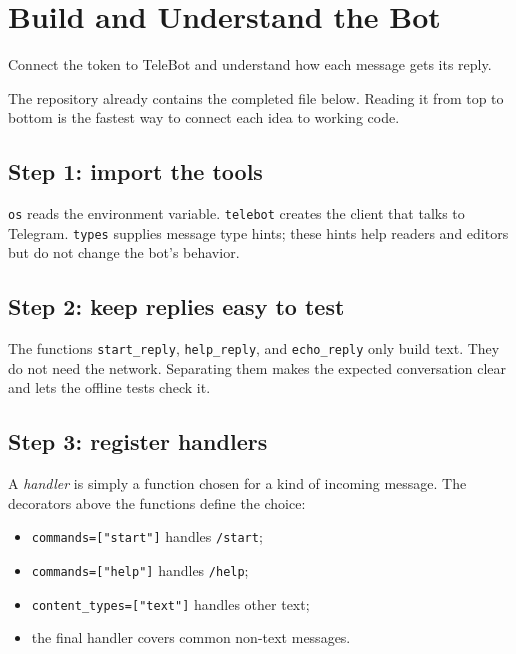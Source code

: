 \chapter{Build and Understand the Bot}

\begin{goalbox}
Connect the token to TeleBot and understand how each message gets its reply.
\end{goalbox}

The repository already contains the completed file below. Reading it from top to
bottom is the fastest way to connect each idea to working code.



\section{Step 1: import the tools}

\texttt{os} reads the environment variable. \texttt{telebot} creates the client
that talks to Telegram. \texttt{types} supplies message type hints; these hints
help readers and editors but do not change the bot's behavior.

\section{Step 2: keep replies easy to test}

The functions \texttt{start\_reply}, \texttt{help\_reply}, and
\texttt{echo\_reply} only build text. They do not need the network. Separating
them makes the expected conversation clear and lets the offline tests check it.

\section{Step 3: register handlers}

A \emph{handler} is simply a function chosen for a kind of incoming message.
The decorators above the functions define the choice:

\begin{itemize}
\item \texttt{commands=["start"]} handles \texttt{/start};
\item \texttt{commands=["help"]} handles \texttt{/help};
\item \texttt{content\_types=["text"]} handles other text;
\item the final handler covers common non-text messages.
\end{itemize}

